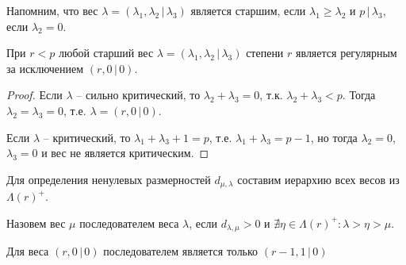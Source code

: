 Напомним, что вес $ \lambda = (\lambda_1, \lambda_2 \,|\, \lambda_3) $ является старшим, 
если $ \lambda_1 \geqslant \lambda_2 $ и $ p \,|\, \lambda_3 $, если $ \lambda_2 = 0 $.

\begin{lemma}
При $ r < p $ любой старший вес $ \lambda = (\lambda_1, \lambda_2 \,|\, \lambda_3) $ степени $r$ 
является регулярным за исключением $ (r, 0 \,|\, 0) $.
\end{lemma}
\begin{proof}
Если $\lambda$ -- сильно критический, то $ \lambda_2 + \lambda_3 = 0 $, т.к. $ \lambda_2 + \lambda_3 < p $. 
Тогда $ \lambda_2 = \lambda_3 = 0 $, т.е. $ \lambda = (r, 0 \,|\, 0) $.

Если $\lambda$ -- критический, то $ \lambda_1 + \lambda_3 + 1 = p $, т.е. $ \lambda_1 + \lambda_3 = p - 1 $,
но тогда $ \lambda_2 = 0 $, $ \lambda_3 = 0 $ и вес не является критическим.
\end{proof}

Для определения ненулевых размерностей $ d_{\mu, \lambda} $ составим иерархию всех весов из $ \Lambda(r)^+ $.

\begin{definition}
Назовем вес $ \mu $ последователем веса $ \lambda $, если $ d_{\lambda, \mu} > 0 $ и $ \nexists \eta \in \Lambda(r)^+ : \lambda > \eta > \mu $.
\end{definition}
Для веса $ (r, 0 \,|\, 0) $ последователем является только $ (r - 1, 1 \,|\, 0) $ 

